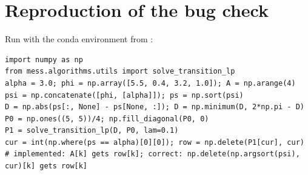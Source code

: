 \documentclass[11pt,a4paper]{article}
\theoremstyle{remark}
\begin{document}
\appendix
\section{Reproduction of the bug check}
Run with the conda environment  from :
\begin{lstlisting}
import numpy as np
from mess.algorithms.utils import solve_transition_lp
alpha = 3.0; phi = np.array([5.5, 0.4, 3.2, 1.0]); A = np.arange(4)
psi = np.concatenate([phi, [alpha]]); ps = np.sort(psi)
D = np.abs(ps[:, None] - ps[None, :]); D = np.minimum(D, 2*np.pi - D)
P0 = np.ones((5, 5))/4; np.fill_diagonal(P0, 0)
P1 = solve_transition_lp(D, P0, lam=0.1)
cur = int(np.where(ps == alpha)[0][0]); row = np.delete(P1[cur], cur)
# implemented: A[k] gets row[k]; correct: np.delete(np.argsort(psi), cur)[k] gets row[k]
\end{lstlisting}
\end{document}
